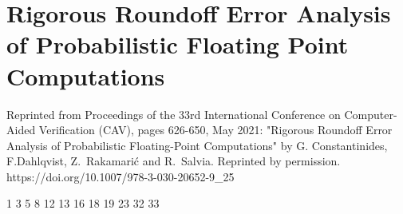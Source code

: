 
\chapter{Rigorous Roundoff Error Analysis of Probabilistic Floating Point Computations}
\label{sec:cav}
Reprinted from Proceedings of the 33rd International Conference on Computer-Aided Verification (CAV), pages 626-650, May 2021: "Rigorous Roundoff Error Analysis of Probabilistic Floating-Point Computations" by G. Constantinides, F.Dahlqvist, Z.~Rakamari\'c and R.~Salvia. Reprinted by permission.\\
https://doi.org/10.1007/978-3-030-20652-9\_25

\setupuuchapterbib

                              		{1}
					{3}
       								{5}
	{8}
						{12}
						{13}
       					{16}
										{18}
						{19}
								{23}
						{32}
				{33}



%
%